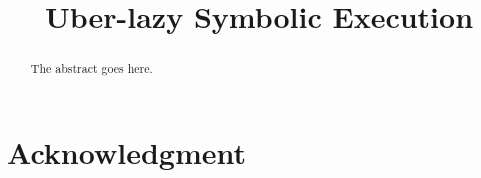 \documentclass[conference]{IEEEtran}
\begin{document}
%
\title{Uber-lazy Symbolic Execution}


\author{
\and
{}
}
\maketitle


\begin{abstract}
The abstract goes here.
\end{abstract}
\IEEEpeerreviewmaketitle

%
%
%
%
%
\section*{Acknowledgment}



\end{document}
